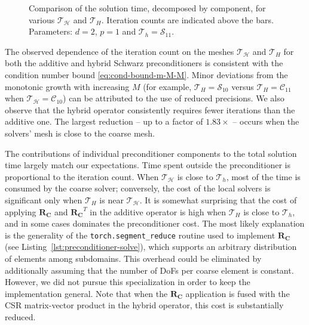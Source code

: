 \documentclass[11pt]{article}
\theoremstyle{definition}
\theoremstyle{theorem}
\begin{document}
\begin{figure}
  \centering
  
  \caption{Comparison of the solution time, decomposed by component,
  for various $\mathcal{T}_\mathcal{H}$ and $\mathcal{T}_H$. Iteration counts
  are indicated above the bars.
  Parameters: $d=2$, $p=1$ and $\mathcal{T}_h=\mathcal{S}_{11}$.}
  \label{fig:parallelism-plots}
\end{figure}

The observed dependence of the iteration count on the meshes $\mathcal{T}_{\mathcal{H}}$
and $\mathcal{T}_H$ for both the additive and hybrid Schwarz preconditioners
is consistent with the condition number bound \eqref{eq:cond-bound-m-M-M}.
Minor deviations from the monotonic growth with increasing $M$
(for example, $\mathcal{T}_H=\mathcal{S}_{10}$ versus $\mathcal{T}_H=\mathcal{C}_{11}$ when
$\mathcal{T}_\mathcal{H}=\mathcal{C}_{10}$) can be attributed to the use of reduced
precisions. We also observe that the hybrid operator consistently requires fewer
iterations than the additive one. The largest reduction -- up to a factor of
$1.83\times$ -- occurs when the solvers' mesh is close to the coarse mesh.

The contributions of individual preconditioner components to the total solution time
largely match our expectations. Time spent outside the preconditioner is
proportional to the iteration count. When $\mathcal{T}_{\mathcal{H}}$ is close
to $\mathcal{T}_h$, most of the time is consumed by the coarse solver; conversely,
the cost of the local solvers is significant only when $\mathcal{T}_H$ is near
$\mathcal{T}_{\mathcal{H}}$. It is somewhat surprising that the cost
of applying $\bm{R_C}$ and $\bm{R_C}^T$ in the additive operator
is high when $\mathcal{T}_H$ is close to $\mathcal{T}_h$, and in some cases
dominates the preconditioner cost. The most likely explanation is the generality
of the \verb|torch.segment_reduce| routine
used to implement $\bm{R_C}$ (see Listing~\ref{lst:preconditioner-solve}), which
supports an arbitrary distribution of elements among subdomains. This overhead
could be eliminated by additionally assuming that the number of DoFs per
coarse element is constant. However, we did not pursue this specialization in order
to keep the implementation general. Note that when the $\bm{R_C}$ application
is fused with the CSR matrix-vector product in the hybrid operator, this cost
is substantially reduced.
\end{document}
